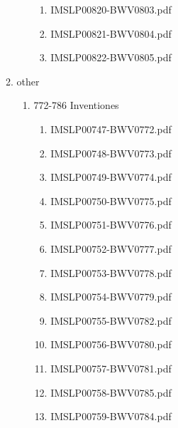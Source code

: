 \documentclass[11pt]{article}
\begin{document}
\begin{enumerate}
\begin{enumerate}
\begin{enumerate}
\begin{enumerate}
\item IMSLP00820-BWV0803.pdf
\label{sec-1-1-1-1-44-6-4-1-19-2}

\item IMSLP00821-BWV0804.pdf
\label{sec-1-1-1-1-44-6-4-1-19-3}

\item IMSLP00822-BWV0805.pdf
\label{sec-1-1-1-1-44-6-4-1-19-4}
\end{enumerate}
\end{enumerate}

\item other
\label{sec-1-1-1-1-44-6-4-2}
\begin{enumerate}
\item 772-786 Inventiones
\label{sec-1-1-1-1-44-6-4-2-1}
\begin{enumerate}
\item IMSLP00747-BWV0772.pdf
\label{sec-1-1-1-1-44-6-4-2-1-1}

\item IMSLP00748-BWV0773.pdf
\label{sec-1-1-1-1-44-6-4-2-1-2}

\item IMSLP00749-BWV0774.pdf
\label{sec-1-1-1-1-44-6-4-2-1-3}

\item IMSLP00750-BWV0775.pdf
\label{sec-1-1-1-1-44-6-4-2-1-4}

\item IMSLP00751-BWV0776.pdf
\label{sec-1-1-1-1-44-6-4-2-1-5}

\item IMSLP00752-BWV0777.pdf
\label{sec-1-1-1-1-44-6-4-2-1-6}

\item IMSLP00753-BWV0778.pdf
\label{sec-1-1-1-1-44-6-4-2-1-7}

\item IMSLP00754-BWV0779.pdf
\label{sec-1-1-1-1-44-6-4-2-1-8}

\item IMSLP00755-BWV0782.pdf
\label{sec-1-1-1-1-44-6-4-2-1-9}

\item IMSLP00756-BWV0780.pdf
\label{sec-1-1-1-1-44-6-4-2-1-10}

\item IMSLP00757-BWV0781.pdf
\label{sec-1-1-1-1-44-6-4-2-1-11}

\item IMSLP00758-BWV0785.pdf
\label{sec-1-1-1-1-44-6-4-2-1-12}

\item IMSLP00759-BWV0784.pdf
\label{sec-1-1-1-1-44-6-4-2-1-13}


\end{enumerate}
\end{enumerate}
\end{enumerate}
\end{enumerate}
\end{document}
